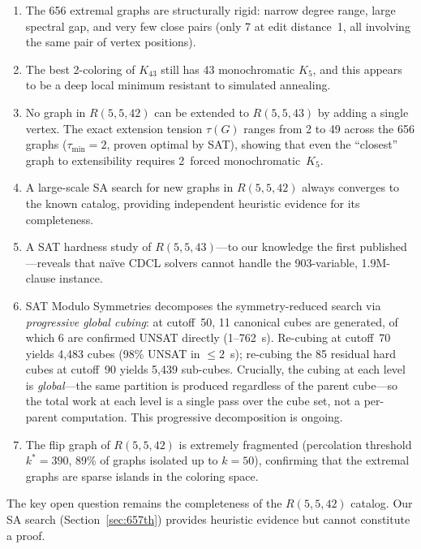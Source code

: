 \documentclass[11pt,a4paper]{article}
\theoremstyle{definition}
\theoremstyle{remark}
\newcommand{\Kn}[1]{K_{#1}}
\newcommand{\Rset}[3]{R(#1,#2,#3)}
\begin{document}
\begin{enumerate}
  \item The 656 extremal graphs are structurally rigid:
    narrow degree range, large spectral gap, and very few
    close pairs (only 7 at edit distance~1, all involving
    the same pair of vertex positions).
  \item The best 2-coloring of $\Kn{43}$ still has 43
    monochromatic $K_5$, and this appears to be a deep
    local minimum resistant to simulated annealing.
  \item No graph in $\Rset{5}{5}{42}$ can be extended
    to $\Rset{5}{5}{43}$ by adding a single vertex.
    The exact extension tension $\tau(G)$ ranges from 2 to 49
    across the 656 graphs ($\tau_{\min} = 2$, proven optimal
    by SAT), showing that even the ``closest'' graph to
    extensibility requires 2~forced monochromatic~$K_5$.
  \item A large-scale SA search for new graphs in $\Rset{5}{5}{42}$
    always converges to the known catalog, providing independent
    heuristic evidence for its completeness.
  \item A SAT hardness study of $R(5,5,43)$---to our knowledge
    the first published---reveals that na\"ive CDCL solvers
    cannot handle the 903-variable, 1.9M-clause instance.
  \item SAT Modulo Symmetries decomposes the symmetry-reduced
    search via \emph{progressive global cubing}: at cutoff~50,
    11 canonical cubes are generated, of which 6 are
    confirmed UNSAT directly (1--762~s).  Re-cubing at
    cutoff~70 yields 4{,}483 cubes (98\% UNSAT in $\leq 2$~s);
    re-cubing the 85 residual hard cubes at cutoff~90 yields
    5{,}439 sub-cubes.  Crucially, the cubing at each level
    is \emph{global}---the same partition is produced regardless
    of the parent cube---so the total work at each level is
    a single pass over the cube set, not a per-parent computation.
    This progressive decomposition is ongoing.
  \item The flip graph of $\Rset{5}{5}{42}$ is extremely fragmented
    (percolation threshold $k^* = 390$, 89\% of graphs isolated
    up to $k = 50$), confirming that the extremal graphs are sparse
    islands in the coloring space.
\end{enumerate}

The key open question remains the completeness of the
$\Rset{5}{5}{42}$ catalog.  Our SA search (Section~\ref{sec:657th})
provides heuristic evidence but cannot constitute a proof.
\end{document}
